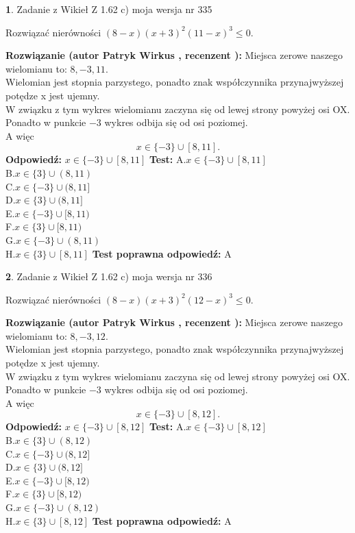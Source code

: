 \documentclass[12pt, a4paper]{article}
\theoremstyle{definition} %
\newtheorem{zad}{}
\newcommand{\zadStart}[1]{\begin{zad}#1\newline}
\newcommand{\zadStop}{\end{zad}}
\newcommand{\rozwStart}[2]{\noindent \textbf{Rozwiązanie (autor #1 , recenzent #2): }\newline}
\newcommand{\rozwStop}{\newline}
\newcommand{\odpStart}{\noindent \textbf{Odpowiedź:}\newline}
\newcommand{\odpStop}{\newline}
\newcommand{\testStart}{\noindent \textbf{Test:}\newline}
\newcommand{\testStop}{\newline}
\newcommand{\kluczStart}{\noindent \textbf{Test poprawna odpowiedź:}\newline}
\newcommand{\kluczStop}{\newline}
\begin{document}
\zadStart{Zadanie z Wikieł Z 1.62 c) moja wersja nr 335}

Rozwiązać nierówności $(8-x)(x+3)^{2}(11-x)^{3}\le0$.
\zadStop
\rozwStart{Patryk Wirkus}{}
Miejsca zerowe naszego wielomianu to: $8, -3, 11$.\\
Wielomian jest stopnia parzystego, ponadto znak współczynnika przy\linebreak najwyższej potędze x jest ujemny.\\ W związku z tym wykres wielomianu zaczyna się od lewej strony powyżej osi OX.\\
Ponadto w punkcie $-3$ wykres odbija się od osi poziomej.\\
A więc $$x \in \{-3\} \cup [8,11].$$
\rozwStop
\odpStart
$x \in \{-3\} \cup [8,11]$
\odpStop
\testStart
A.$x \in \{-3\} \cup [8,11]$\\
B.$x \in \{3\} \cup (8,11)$\\
C.$x \in \{-3\} \cup (8,11]$\\
D.$x \in \{3\} \cup (8,11]$\\
E.$x \in \{-3\} \cup [8,11)$\\
F.$x \in \{3\} \cup [8,11)$\\
G.$x \in \{-3\} \cup (8,11)$\\
H.$x \in \{3\} \cup [8,11]$
\testStop
\kluczStart
A
\kluczStop



\zadStart{Zadanie z Wikieł Z 1.62 c) moja wersja nr 336}

Rozwiązać nierówności $(8-x)(x+3)^{2}(12-x)^{3}\le0$.
\zadStop
\rozwStart{Patryk Wirkus}{}
Miejsca zerowe naszego wielomianu to: $8, -3, 12$.\\
Wielomian jest stopnia parzystego, ponadto znak współczynnika przy\linebreak najwyższej potędze x jest ujemny.\\ W związku z tym wykres wielomianu zaczyna się od lewej strony powyżej osi OX.\\
Ponadto w punkcie $-3$ wykres odbija się od osi poziomej.\\
A więc $$x \in \{-3\} \cup [8,12].$$
\rozwStop
\odpStart
$x \in \{-3\} \cup [8,12]$
\odpStop
\testStart
A.$x \in \{-3\} \cup [8,12]$\\
B.$x \in \{3\} \cup (8,12)$\\
C.$x \in \{-3\} \cup (8,12]$\\
D.$x \in \{3\} \cup (8,12]$\\
E.$x \in \{-3\} \cup [8,12)$\\
F.$x \in \{3\} \cup [8,12)$\\
G.$x \in \{-3\} \cup (8,12)$\\
H.$x \in \{3\} \cup [8,12]$
\testStop
\kluczStart
A
\kluczStop
\end{document}
